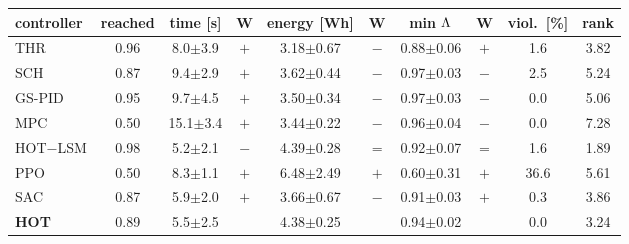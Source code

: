\begin{tabular}{l|c|cc|cc|cc|c|c}\toprule
controller & reached & time [s] & W & energy [Wh] & W & min $\Lambda$ & W & viol.\ [\%] & rank\\\midrule
THR & 0.96 & 8.0$\pm$3.9 & $+$ & 3.18$\pm$0.67 & $-$ & 0.88$\pm$0.06 & $+$ & 1.6 & 3.82\\
SCH & 0.87 & 9.4$\pm$2.9 & $+$ & 3.62$\pm$0.44 & $-$ & 0.97$\pm$0.03 & $-$ & 2.5 & 5.24\\
GS-PID & 0.95 & 9.7$\pm$4.5 & $+$ & 3.50$\pm$0.34 & $-$ & 0.97$\pm$0.03 & $-$ & 0.0 & 5.06\\
MPC & 0.50 & 15.1$\pm$3.4 & $+$ & 3.44$\pm$0.22 & $-$ & 0.96$\pm$0.04 & $-$ & 0.0 & 7.28\\
HOT$-$LSM & 0.98 & 5.2$\pm$2.1 & $-$ & 4.39$\pm$0.28 & $=$ & 0.92$\pm$0.07 & $=$ & 1.6 & 1.89\\
PPO & 0.50 & 8.3$\pm$1.1 & $+$ & 6.48$\pm$2.49 & $+$ & 0.60$\pm$0.31 & $+$ & 36.6 & 5.61\\
SAC & 0.87 & 5.9$\pm$2.0 & $+$ & 3.66$\pm$0.67 & $-$ & 0.91$\pm$0.03 & $+$ & 0.3 & 3.86\\
\textbf{HOT} & 0.89 & 5.5$\pm$2.5 &  & 4.38$\pm$0.25 &  & 0.94$\pm$0.02 &  & 0.0 & 3.24\\
\bottomrule\end{tabular}